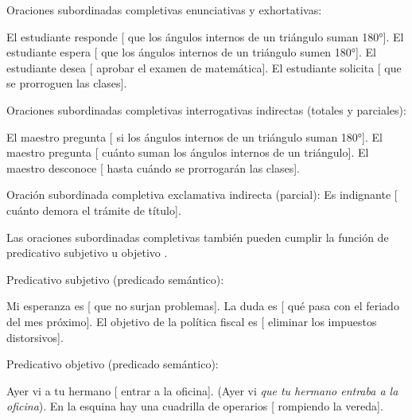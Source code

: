 \begin{exe}
  \ex Oraciones subordinadas completivas enunciativas y exhortativas:
    \begin{xlist}
      \ex\label{ex:13-enun-a} El estudiante responde [ que los
          ángulos internos de un triángulo suman 180°].
      \ex\label{ex:13-enun-b} El estudiante espera [ que los ángulos
          internos de un triángulo sumen 180°].
      \ex\label{ex:13-enun-c} El estudiante desea [ aprobar el
          examen de matemática].
      \ex\label{ex:13-enun-d} El estudiante solicita [ que se
          prorroguen las clases].
    \end{xlist}
  \ex\label{ex:13-indir} Oraciones subordinadas completivas interrogativas
      indirectas (totales y parciales):
    \begin{xlist}
      \ex\label{ex:13-indir-a} El maestro pregunta [ si los ángulos
          internos de un triángulo suman 180°].
      \ex\label{ex:13-indir-b} El maestro pregunta [ cuánto suman los
          ángulos internos de un triángulo].
      \ex\label{ex:13-indir-c} El maestro desconoce [ hasta cuándo se
          prorrogarán las clases].
    \end{xlist}
  \ex\label{ex:13-indign} Oración subordinada completiva exclamativa indirecta
      (parcial): Es indignante [ cuánto demora el trámite de título].
\end{exe}

Las oraciones subordinadas completivas también pueden cumplir la función de
predicativo subjetivo  u objetivo .

\begin{exe}
  \ex\label{ex:13-ps} Predicativo subjetivo (predicado semántico):
    \begin{xlist}
      \ex Mi esperanza es [ que no surjan problemas].
      \ex La duda es [ qué pasa con el feriado del mes próximo].
      \ex El objetivo de la política fiscal es [ eliminar los
          impuestos distorsivos].
    \end{xlist}
  \ex\label{ex:13-po} Predicativo objetivo (predicado semántico):
    \begin{xlist}
      \ex Ayer vi a tu hermano [ entrar a la oficina]. (Ayer vi
          \textit{que tu hermano entraba a la oficina}).
      \ex En la esquina hay una cuadrilla de operarios [ rompiendo la
          vereda].
    \end{xlist}
\end{exe}

